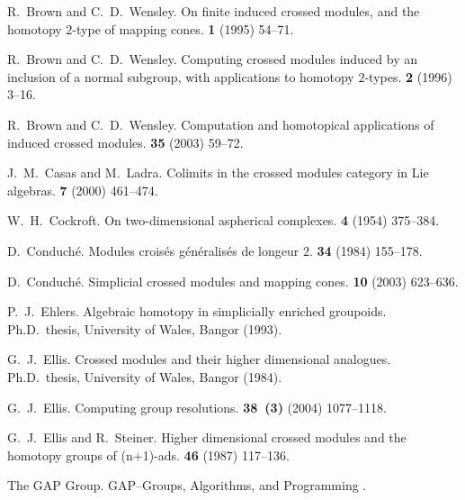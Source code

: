 \begin{thebibliography}{notesdev}
R.~Brown and C.~D.~Wensley.
\newblock On finite induced crossed modules, and the homotopy $2$-type of
  mapping cones.
 {\bf 1} (1995) 54--71.

R.~Brown and C.~D.~Wensley.
\newblock Computing crossed modules induced by an inclusion of a normal
  subgroup, with applications to homotopy $2$-types.
 {\bf 2} (1996) 3--16.

R.~Brown and C.~D.~Wensley.
\newblock Computation and homotopical applications of induced crossed modules.
 {\bf 35} (2003) 59--72.

J.~M.~Casas and M.~Ladra.
\newblock Colimits in the crossed modules category in Lie algebras.
 {\bf 7} (2000) 461--474.

W.~H.~Cockroft.
\newblock On two-dimensional aspherical complexes.
 {\bf 4} (1954) 375--384.

D.~Conduch\'e.
\newblock Modules crois\'es g\'en\'eralis\'es de longeur $2$.
 {\bf 34} (1984) 155--178.

D.~Conduch\'e.
\newblock Simplicial crossed modules and mapping cones.
 {\bf 10} (2003) 623--636.

P.~J.~Ehlers.
\newblock Algebraic homotopy in simplicially enriched groupoids.
\newblock Ph.{D}.~thesis, University of Wales, Bangor (1993).

G.~J.~Ellis.
\newblock Crossed modules and their higher dimensional analogues.
\newblock Ph.{D}.~thesis, University of Wales, Bangor (1984).

G.~J.~Ellis.
\newblock Computing group resolutions.
 {\bf 38~(3)} (2004) 1077--1118.

G.~J.~Ellis and R.~Steiner.
\newblock Higher dimensional crossed modules and the homotopy groups of
  (n+1)-ads.
 {\bf 46} (1987) 117--136.

The GAP Group.
\newblock GAP--Groups, Algorithms, and Programming .


\end{thebibliography}
